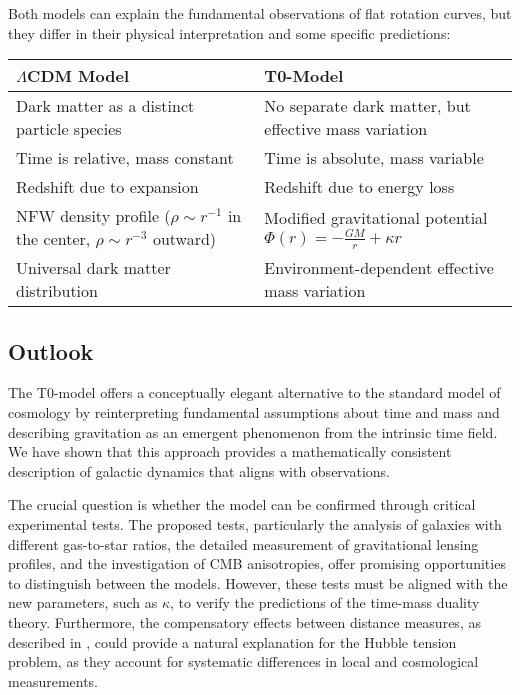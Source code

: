 \documentclass[a4paper,12pt]{article}
\begin{document}
	Both models can explain the fundamental observations of flat rotation curves, but they differ in their physical interpretation and some specific predictions:
	
	\begin{tcolorbox}[colback=yellow!5!white,colframe=yellow!75!black,title=Comparison of the Models]
		\begin{tabular}{|p{}|p{}|}
			\hline
			\textbf{$\Lambda$CDM Model} & \textbf{T0-Model} \\
			\hline
			Dark matter as a distinct particle species & No separate dark matter, but effective mass variation \\
			\hline
			Time is relative, mass constant & Time is absolute, mass variable \\
			\hline
			Redshift due to expansion & Redshift due to energy loss \\
			\hline
			NFW density profile ($\rho \sim r^{-1}$ in the center, $\rho \sim r^{-3}$ outward) & Modified gravitational potential $\Phi(r) = -\frac{G M}{r} + \kappa r$ \\
			\hline
			Universal dark matter distribution & Environment-dependent effective mass variation \\
			\hline
		\end{tabular}
	\end{tcolorbox}
	
	\subsection{Outlook}
	
	The T0-model offers a conceptually elegant alternative to the standard model of cosmology by reinterpreting fundamental assumptions about time and mass and describing gravitation as an emergent phenomenon from the intrinsic time field. We have shown that this approach provides a mathematically consistent description of galactic dynamics that aligns with observations.
	
	The crucial question is whether the model can be confirmed through critical experimental tests. The proposed tests, particularly the analysis of galaxies with different gas-to-star ratios, the detailed measurement of gravitational lensing profiles, and the investigation of CMB anisotropies, offer promising opportunities to distinguish between the models. However, these tests must be aligned with the new parameters, such as \( \kappa \), to verify the predictions of the time-mass duality theory. Furthermore, the compensatory effects between distance measures, as described in \cite{pascher_messdifferenzen_2025}, could provide a natural explanation for the Hubble tension problem, as they account for systematic differences in local and cosmological measurements.
	
\end{document}
